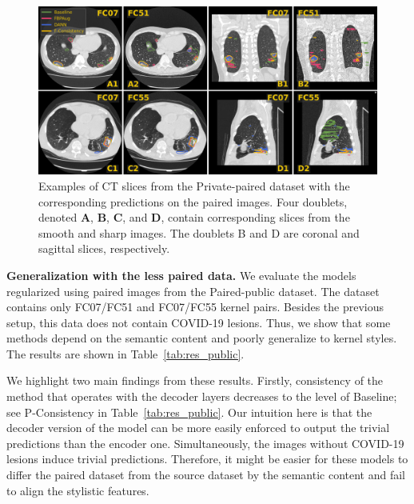 \begin{landscape}
\begin{figure}[p]
	\includegraphics[width=\linewidth]{Dissertation/Figures/3_ct/consistency_preds.png}
	\caption{Examples of CT slices from the Private-paired dataset with the corresponding predictions on the paired images. Four doublets, denoted \textbf{A}, \textbf{B}, \textbf{C}, and \textbf{D}, contain corresponding slices from the smooth and sharp images. The doublets B and D are coronal and sagittal slices, respectively.}
	\label{fig:consistency_preds}
\end{figure}
\end{landscape}



\textbf{Generalization with the less paired data.} We evaluate the models regularized using paired images from the Paired-public dataset. The dataset contains only FC07/FC51 and FC07/FC55 kernel pairs. Besides the previous setup, this data does not contain COVID-19 lesions. Thus, we show that some methods depend on the semantic content and poorly generalize to kernel styles. The results are shown in Table~\ref{tab:res_public}.



We highlight two main findings from these results. Firstly, consistency of the method that operates with the decoder layers decreases to the level of Baseline; see P-Consistency in Table~\ref{tab:res_public}. Our intuition here is that the decoder version of the model can be more easily enforced to output the trivial predictions than the encoder one. Simultaneously, the images without COVID-19 lesions induce trivial predictions. Therefore, it might be easier for these models to differ the paired dataset from the source dataset by the semantic content and fail to align the stylistic features.

